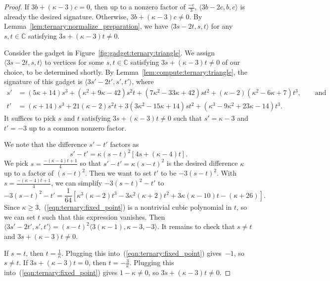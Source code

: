 \documentclass[11pt]{article}
\begin{document}
\begin{proof}
 If $3 b + (\kappa - 3) c = 0$,
 then up to a nonzero factor of $\frac{-c}{3}$,
 $\langle 3 b - 2 c, b, c \rangle$ is already the desired signature.
 Otherwise, $3 b + (\kappa - 3) c \ne 0$.
 By Lemma~\ref{lem:ternary:normalize_preparation},
 we have $\langle 3 s - 2 t, s, t \rangle$ for any $s,t \in \mathbb{C}$ satisfying $3 s + (\kappa - 3) t \ne 0$.
 
 Consider the gadget in Figure~\ref{fig:gadget:ternary:triangle}.
 We assign $\langle 3 s - 2 t, s, t \rangle$ to vertices for some $s, t \in \mathbb{C}$ satisfying $3 s + (\kappa - 3) t \ne 0$ of our choice,
 to be determined shortly.
 By Lemma~\ref{lem:compute:ternary:triangle},
 the signature of this gadget is $\langle 3 s' - 2 t', s', t' \rangle$,
 where
 \begin{align*}
  s' &=   (5 \kappa + 14) s^3
        + (\kappa^2 + 9 \kappa - 42) s^2 t
        + (7 \kappa^2 - 33 \kappa + 42) s t^2
        + (\kappa - 2) (\kappa^2 - 6 \kappa + 7) t^3,
        \qquad \text{and}\\
  t' &=   (\kappa + 14) s^3
        + 21 (\kappa - 2) s^2 t
        + 3 (3 \kappa^2 - 15 \kappa + 14) s t^2
        + (\kappa^3 - 9 \kappa^2 + 23 \kappa - 14) t^3.
 \end{align*}
 It suffices to pick $s$ and $t$ satisfying $3 s + (\kappa - 3) t \ne 0$ such that $s' = \kappa - 3$ and $t' = -3$ up to a common nonzero factor.
 
 We note that the difference $s' - t'$ factors as
 \[
  s' - t' = \kappa (s - t)^2 [4 s + (\kappa - 4) t].
 \]
 We pick $s = \frac{-(\kappa - 4) t + 1}{4}$ so that $s' - t' = \kappa (s - t)^2$ is the desired difference $\kappa$ up to a factor of $(s - t)^2$.
 Then we want to set $t'$ to be $-3 (s - t)^2$.
 With $s = \frac{-(\kappa - 4) t + 1}{4}$,
 we can simplify $-3 (s - t)^2 - t'$ to
 \begin{equation} \label{eqn:ternary:fixed_point}
  -3 (s - t)^2 - t'
  = \frac{1}{64} \left[\kappa^3 (\kappa - 2) t^3 - 3 \kappa^2 (\kappa + 2) t^2 + 3 \kappa (\kappa - 10) t - (\kappa + 26)\right].
 \end{equation}
 Since $\kappa \ge 3$,~(\ref{eqn:ternary:fixed_point}) is a nontrivial cubic polynomial in $t$,
 so we can set $t$ such that this expression vanishes.
 Then $\langle 3 s' - 2 t', s', t' \rangle = (s - t)^2 \langle 3 (\kappa - 1), \kappa - 3, -3 \rangle$.
 It remains to check that $s \ne t$ and $3 s + (\kappa - 3) t \ne 0$.
 
 If $s = t$,
 then $t = \frac{1}{\kappa}$.
 Plugging this into~(\ref{eqn:ternary:fixed_point}) gives~$-1$,
 so $s \ne t$.
 If $3 s + (\kappa - 3) t = 0$,
 then $t = -\frac{3}{\kappa}$.
 Plugging this into~(\ref{eqn:ternary:fixed_point}) gives $1 - \kappa \ne 0$,
 so $3 s + (\kappa - 3) t \ne 0$.
\end{proof}
\end{document}
